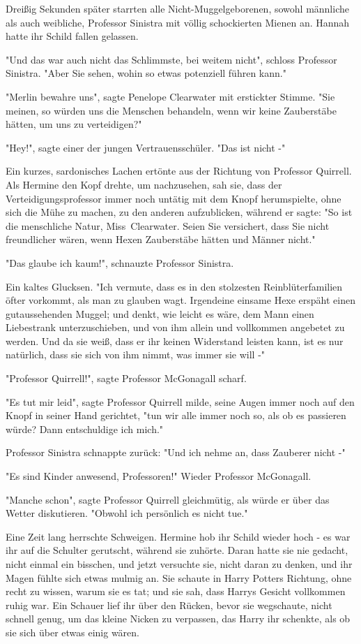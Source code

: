 {Dreißig Sekunden später starrten alle Nicht-Muggelgeborenen, sowohl männliche als auch weibliche, Professor Sinistra mit völlig schockierten Mienen an. Hannah hatte ihr Schild fallen gelassen.

"Und das war auch nicht das Schlimmste, bei weitem nicht", schloss Professor Sinistra. "Aber Sie sehen, wohin so etwas potenziell führen kann."

"Merlin bewahre uns", sagte Penelope Clearwater mit erstickter Stimme. "Sie meinen, so würden uns die Menschen behandeln, wenn wir keine Zauberstäbe hätten, um uns zu verteidigen?"

"Hey!", sagte einer der jungen Vertrauensschüler. "Das ist nicht -"

Ein kurzes, sardonisches Lachen ertönte aus der Richtung von Professor Quirrell. Als Hermine den Kopf drehte, um nachzusehen, sah sie, dass der Verteidigungsprofessor immer noch untätig mit dem Knopf herumspielte, ohne sich die Mühe zu machen, zu den anderen aufzublicken, während er sagte: "So ist die menschliche Natur, Miss~Clearwater. Seien Sie versichert, dass Sie nicht freundlicher wären, wenn Hexen Zauberstäbe hätten und Männer nicht."

"Das glaube ich kaum!", schnauzte Professor Sinistra.

Ein kaltes Glucksen. "Ich vermute, dass es in den stolzesten Reinblüterfamilien öfter vorkommt, als man zu glauben wagt. Irgendeine einsame Hexe erspäht einen gutaussehenden Muggel; und denkt, wie leicht es wäre, dem Mann einen Liebestrank unterzuschieben, und von ihm allein und vollkommen angebetet zu werden. Und da sie weiß, dass er ihr keinen Widerstand leisten kann, ist es nur natürlich, dass sie sich von ihm nimmt, was immer sie will -"

"Professor Quirrell!", sagte Professor McGonagall scharf.

"Es tut mir leid", sagte Professor Quirrell milde, seine Augen immer noch auf den Knopf in seiner Hand gerichtet, "tun wir alle immer noch so, als ob es passieren würde? Dann entschuldige ich mich."

Professor Sinistra schnappte zurück: "Und ich nehme an, dass Zauberer nicht -"

"Es sind Kinder anwesend, Professoren!" Wieder Professor McGonagall.

"Manche schon", sagte Professor Quirrell gleichmütig, als würde er über das Wetter diskutieren. "Obwohl ich persönlich es nicht tue."

Eine Zeit lang herrschte Schweigen. Hermine hob ihr Schild wieder hoch - es war ihr auf die Schulter gerutscht, während sie zuhörte. Daran hatte sie nie gedacht, nicht einmal ein bisschen, und jetzt versuchte sie, nicht daran zu denken, und ihr Magen fühlte sich etwas mulmig an. Sie schaute in Harry Potters Richtung, ohne recht zu wissen, warum sie es tat; und sie sah, dass Harrys Gesicht vollkommen ruhig war. Ein Schauer lief ihr über den Rücken, bevor sie wegschaute, nicht schnell genug, um das kleine Nicken zu verpassen, das Harry ihr schenkte, als ob sie sich über etwas einig wären.

}
